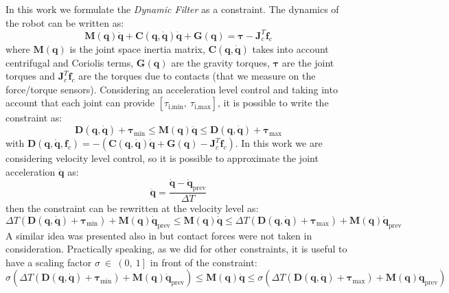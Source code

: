 In this work we formulate the \emph{Dynamic Filter} as a constraint. The dynamics of the robot can be written as:
\begin{equation}
\mathbf{M}(\mathbf{q})\mathbf{\ddot{q}} + \mathbf{C}(\mathbf{q},\mathbf{\dot{q}})\mathbf{\dot{q}} + \mathbf{G}(\mathbf{q}) = \boldsymbol{\tau} - \mathbf{J}^T_c\mathbf{f}_c
\end{equation}
where $\mathbf{M}(\mathbf{q})$ is the joint space inertia matrix, $\mathbf{C}(\mathbf{q},\mathbf{\dot{q}})$ takes into account centrifugal and Coriolis terms, $\mathbf{G}(\mathbf{q})$ are the gravity torques, $\boldsymbol{\tau}$ are the joint torques and $\mathbf{J}^T_c\mathbf{f}_c$ are the torques due to contacts (that we measure on the force/torque sensors). 
Considering an acceleration level control and taking into account that each joint can provide $\left[\tau_{\text{i,min}}, \ \tau_{\text{i,max}} \right]$, it is possible to write the constraint as:
\begin{equation}
\mathbf{D}(\mathbf{q, \dot{q}}) + \boldsymbol{\tau}_\text{min}\leq \mathbf{M}(\mathbf{q})\mathbf{\ddot{q}} \leq  \mathbf{D}(\mathbf{q, \dot{q}}) + \boldsymbol{\tau}_\text{max}
\end{equation}
with $\mathbf{D}(\mathbf{q, \dot{q}},\mathbf{f}_c) = -\left(\mathbf{C}(\mathbf{q},\mathbf{\dot{q}})\mathbf{\dot{q}} + \mathbf{G}(\mathbf{q}) - \mathbf{J}^T_c\mathbf{f}_c \right )$. In this work we are considering velocity level control, so it is possible to approximate the joint acceleration $\mathbf{\ddot{q}}$ as:
\begin{equation}
\mathbf{\ddot{q}} = \frac{\mathbf{\dot{q}}-\mathbf{\dot{q}}_\text{prev}}{\Delta T}
\end{equation}
then the constraint can be rewritten at the velocity level as:
\begin{equation}
\Delta T \left(\mathbf{D}(\mathbf{q}, \mathbf{\dot{q}}) + \boldsymbol{\tau}_\text{min}\right ) + \mathbf{M}(\mathbf{q})\mathbf{\dot{q}}_\text{prev} \leq
\mathbf{M}(\mathbf{q})\mathbf{\dot{q}} 
\leq  \Delta T \left(\mathbf{D}(\mathbf{q}, \mathbf{\dot{q}}) + \boldsymbol{\tau}_\text{max}\right)+ \mathbf{M}(\mathbf{q})\mathbf{\dot{q}}_\text{prev}
\label{robot_dynamics_constraint}
\end{equation}
A similar idea was presented also in \cite{park1998-ib} but contact forces were not taken in consideration.
Practically speaking, as we did for other constraints, it is useful to have a scaling factor $\sigma \ \in \ \left(0, \ 1 \right]$ in front of the constraint:
\begin{equation}
\sigma \left(\Delta T \left(\mathbf{D}(\mathbf{q}, \mathbf{\dot{q}}) + \boldsymbol{\tau}_\text{min}\right ) + \mathbf{M}(\mathbf{q})\mathbf{\dot{q}}_\text{prev} \right)\leq
\mathbf{M}(\mathbf{q})\mathbf{\dot{q}} 
\leq  \sigma \left(\Delta T \left(\mathbf{D}(\mathbf{q}, \mathbf{\dot{q}}) + \boldsymbol{\tau}_\text{max}\right)+ \mathbf{M}(\mathbf{q})\mathbf{\dot{q}}_\text{prev}\right)
\label{robot_dynamics_constraint_2}
\end{equation}


